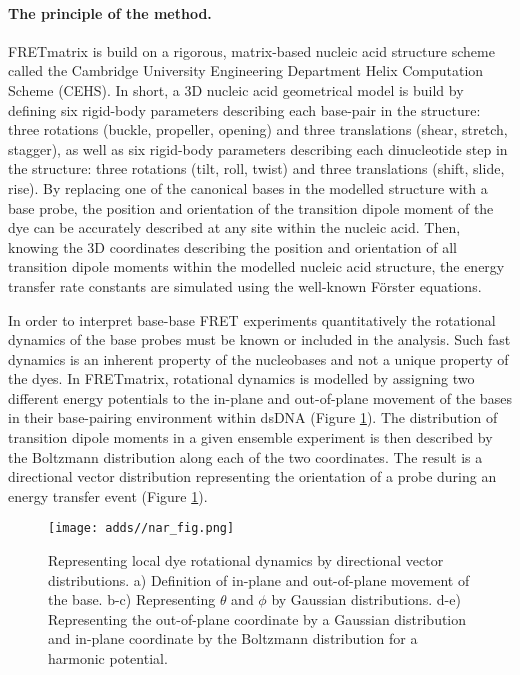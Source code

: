  \paragraph{The principle of the method.} FRETmatrix is build on a rigorous, matrix-based nucleic acid structure scheme called the Cambridge University Engineering Department Helix Computation Scheme (CEHS). In short, a 3D nucleic acid geometrical model is build by defining six rigid-body parameters describing each base-pair in the structure: three rotations (buckle, propeller, opening) and three translations (shear, stretch, stagger), as well as six rigid-body parameters describing each dinucleotide step in the structure: three rotations (tilt, roll, twist) and three translations (shift, slide, rise). By replacing one of the canonical bases in the modelled structure with a base probe, the position and orientation of the transition dipole moment of the dye can be accurately described at any site within the nucleic acid. Then, knowing the 3D coordinates describing the position and orientation of all transition dipole moments within the modelled nucleic acid structure, the energy transfer rate constants are simulated using the well-known Förster equations.

 In order to interpret base-base FRET experiments quantitatively the rotational dynamics of the base probes must be known or included in the analysis. Such fast dynamics is an inherent property of the nucleobases and not a unique property of the dyes. In FRETmatrix, rotational dynamics is modelled by assigning two different energy potentials to the in-plane and out-of-plane movement of the bases in their base-pairing environment within dsDNA (Figure \ref{Fig:chap_Papers_NAR}). The distribution of transition dipole moments in a given ensemble experiment is then described by the Boltzmann distribution along each of the two coordinates. The result is a directional vector distribution representing the orientation of a probe during an energy transfer event (Figure \ref{Fig:chap_Papers_NAR}).

\begin{figure}
    \centering
        \texttt{[image: adds//nar\_fig.png]}
    \captionsetup{width=.95\textwidth}
    \caption{Representing local dye rotational dynamics by directional vector distributions. a) Definition of in-plane and out-of-plane movement of the base. b-c) Representing $\theta$ and $\phi$ by Gaussian distributions. d-e) Representing the out-of-plane coordinate by a Gaussian distribution and in-plane coordinate by the Boltzmann distribution for a harmonic potential.}
    \label{Fig:chap_Papers_NAR}
\end{figure}

